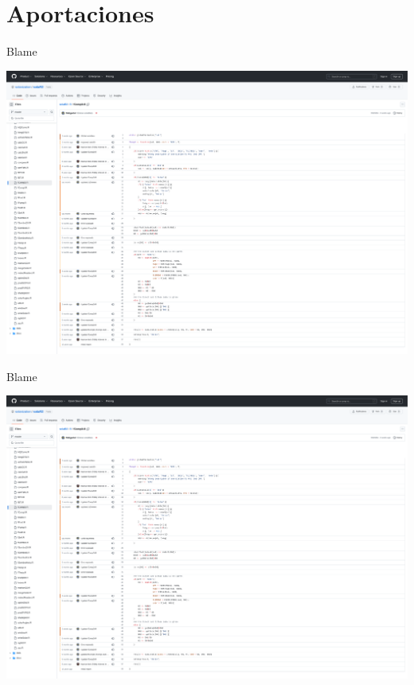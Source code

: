 \documentclass[aspectratio=169, usenames,svgnames,dvipsnames]{beamer}
\begin{document}
\section{Aportaciones}
\label{sec:orgd6f6a0d}
\begin{frame}[label={sec:orgc4a4a94}]{Blame}
\begin{center}
\includegraphics[height=0.9\textheight]{../figuras/blame-fCompD.pdf}
\end{center}
\end{frame}
\begin{frame}[label={sec:org3e4f304}]{Blame}
\begin{center}
\includegraphics[width=\textwidth]{../figuras/blame-fCompD_cropped.pdf}
\end{center}
\end{frame}
\end{document}
